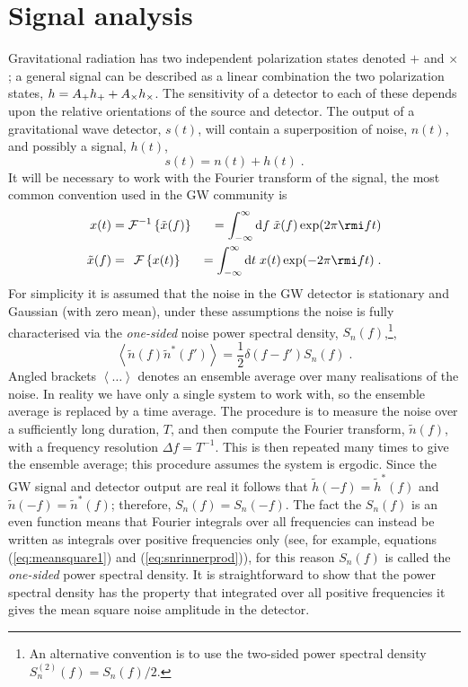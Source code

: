 \section{Signal analysis}\label{sec:conventions}

Gravitational radiation has two independent polarization states denoted $+$ and $\times$; a general signal can be described as a linear combination the two polarization states, $h \nobreak=\nobreak A_{+} h_{+}\nobreak +\nobreak A_{\times} h_{\times}$. The sensitivity of a detector to each of these depends upon the relative orientations of the source and detector. The output of a gravitational wave detector, $s(t)$, will contain a superposition of noise, $n(t)$, and possibly a signal, $h(t)$,
\begin{equation} s(t)=n(t)+h(t) \; . \end{equation}
It will be necessary to work with the Fourier transform of the signal, the most common convention used in the GW community is
\begin{eqnarray} x(t)&={\cal{F}}^{-1}\left\{\tilde{x}(f)\right\}&=\int_{-\infty}^{\infty}\textrm{d}f\;\tilde{x}(f)\exp (2\pi \rmi f t )  \nonumber \\
\tilde{x}(f) &=\,\;{\cal{F}}\left\{x(t)\right\}&=\int_{-\infty}^{\infty}\textrm{d}t\;x(t)\exp (-2\pi \rmi f t )\; .\end{eqnarray}
For simplicity it is assumed that the noise in the GW detector is stationary and Gaussian (with zero mean), under these assumptions the noise is fully characterised via the \emph{one-sided} noise power spectral density, $S_{n}(f)$,\footnote{An alternative convention is to use the two-sided power spectral density $S^{(2)}_{n}(f)=S_{n}(f)/2$.}, 
\begin{equation}\label{eq:psd} \left<\tilde{n}(f)\tilde{n}^{*}(f')\right>=\frac{1}{2}\delta (f-f')S_{n}(f) \; .\end{equation}
Angled brackets $\left<\ldots\right>$ denotes an ensemble average over many realisations of the noise. In reality we have only a single system to work with, so the ensemble average is replaced by a time average. The procedure is to measure the noise over a sufficiently long duration, $T$, and then compute the Fourier transform, $\tilde{n}(f)$, with a frequency resolution $\Delta f = T^{-1}$. This is then repeated many times to give the ensemble average; this procedure assumes the system is ergodic. Since the GW signal and detector output are real it follows that $\tilde{h}(-f)=\tilde{h}^{*}(f)$ and $\tilde{n}(-f)=\tilde{n}^{*}(f)$; therefore, $S_{n}(f)=S_{n}(-f)$. The fact the $S_{n}(f)$ is an even function means that Fourier integrals over all frequencies can instead be written as integrals over positive frequencies only (see, for example, equations (\ref{eq:meansquare1}) and (\ref{eq:snrinnerprod})), for this reason $S_{n}(f)$ is called the \emph{one-sided} power spectral density. It is straightforward to show that the power spectral density has the property that integrated over all positive frequencies it gives the mean square noise amplitude in the detector.
